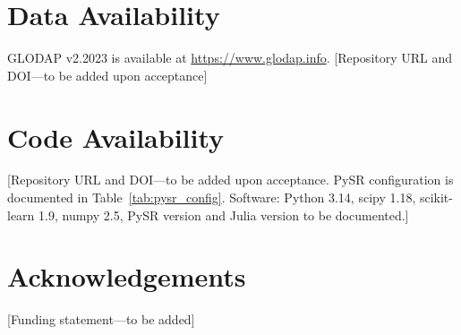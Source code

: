 \documentclass[12pt,a4paper]{article}
\begin{document}

\section*{Data Availability}

GLODAP v2.2023 is available at \url{https://www.glodap.info}. [Repository URL and DOI---to be added upon acceptance]

\section*{Code Availability}

[Repository URL and DOI---to be added upon acceptance. PySR configuration is documented in Table~\ref{tab:pysr_config}. Software: Python 3.14, scipy 1.18, scikit-learn 1.9, numpy 2.5, PySR version and Julia version to be documented.]

\section*{Acknowledgements}

[Funding statement---to be added]



\end{document}
